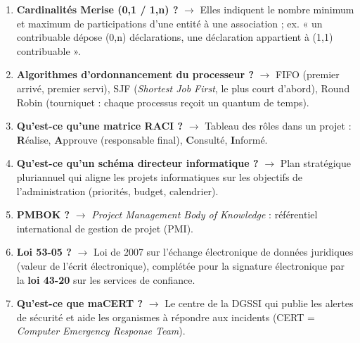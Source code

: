 \begin{enumerate}[leftmargin=*]
    \item \textbf{Cardinalités Merise (0,1 / 1,n) ?} $\rightarrow$ Elles indiquent le nombre minimum et maximum de participations d'une entité à une association ; ex. « un contribuable dépose (0,n) déclarations, une déclaration appartient à (1,1) contribuable ».
    \item \textbf{Algorithmes d'ordonnancement du processeur ?} $\rightarrow$ FIFO (premier arrivé, premier servi), SJF (\textit{Shortest Job First}, le plus court d'abord), Round Robin (tourniquet : chaque processus reçoit un quantum de temps).
    \item \textbf{Qu'est-ce qu'une matrice RACI ?} $\rightarrow$ Tableau des rôles dans un projet : \textbf{R}éalise, \textbf{A}pprouve (responsable final), \textbf{C}onsulté, \textbf{I}nformé.
    \item \textbf{Qu'est-ce qu'un schéma directeur informatique ?} $\rightarrow$ Plan stratégique pluriannuel qui aligne les projets informatiques sur les objectifs de l'administration (priorités, budget, calendrier).
    \item \textbf{PMBOK ?} $\rightarrow$ \textit{Project Management Body of Knowledge} : référentiel international de gestion de projet (PMI).
    \item \textbf{Loi 53-05 ?} $\rightarrow$ Loi de 2007 sur l'échange électronique de données juridiques (valeur de l'écrit électronique), complétée pour la signature électronique par la \textbf{loi 43-20} sur les services de confiance.
    \item \textbf{Qu'est-ce que maCERT ?} $\rightarrow$ Le centre de la DGSSI qui publie les alertes de sécurité et aide les organismes à répondre aux incidents (CERT = \textit{Computer Emergency Response Team}).
\end{enumerate}


